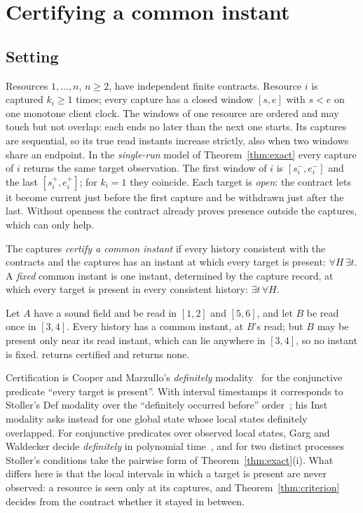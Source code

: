 \section{Certifying a common instant}\label{sec:instants}

\subsection{Setting}
Resources $1,\dots,n$, $n\ge2$, have independent finite contracts. Resource $i$
is captured $k_i\ge1$ times; every capture has a closed window $[s,e]$ with
$s<e$ on one monotone client clock. The windows of one resource are ordered and
may touch but not overlap: each ends no later than the next one starts. Its
captures are sequential, so its true read instants increase strictly, also
when two windows share an endpoint. In the
\emph{single-run} model of Theorem~\ref{thm:exact} every capture of $i$ returns
the same target observation. The first window of $i$ is $[s_i^-,e_i^-]$ and the
last $[s_i^+,e_i^+]$; for $k_i=1$ they coincide. Each target is \emph{open}: the
contract lets it become current just before the first capture and be
withdrawn just after the last. Without openness the contract already proves
presence outside the captures, which can only help.

The captures \emph{certify a common instant} if every history consistent with
the contracts and the captures has an instant at which every target is
present: $\forall H\,\exists t$. A \emph{fixed} common instant is one instant,
determined by the capture record, at which every target is present in every
consistent history: $\exists t\,\forall H$.

\begin{example}
Let $A$ have a sound field and be read in $[1,2]$ and $[5,6]$, and let $B$ be
read once in $[3,4]$. Every history has a common instant, at $B$'s read; but
$B$ may be present only near its read instant, which can lie anywhere in
$[3,4]$, so no instant is fixed.  returns certified and
 returns none.
\end{example}

Certification is Cooper and Marzullo's \emph{definitely}
modality~\cite{cooper1991} for the conjunctive predicate ``every target is
present''. With interval timestamps it corresponds to Stoller's Def modality
over the ``definitely occurred before'' order~\cite{stoller2000}; his Inst
modality asks instead for one global state whose local states definitely
overlapped. For conjunctive predicates over observed local states, Garg and
Waldecker decide \emph{definitely} in polynomial time~\cite{garg1996}, and
for two distinct processes Stoller's conditions take the pairwise form of
Theorem~\ref{thm:exact}(i). What differs here is that the local intervals in
which a target is present are never observed: a resource is seen only at its
captures, and Theorem~\ref{thm:criterion} decides from the contract whether
it stayed in between.

